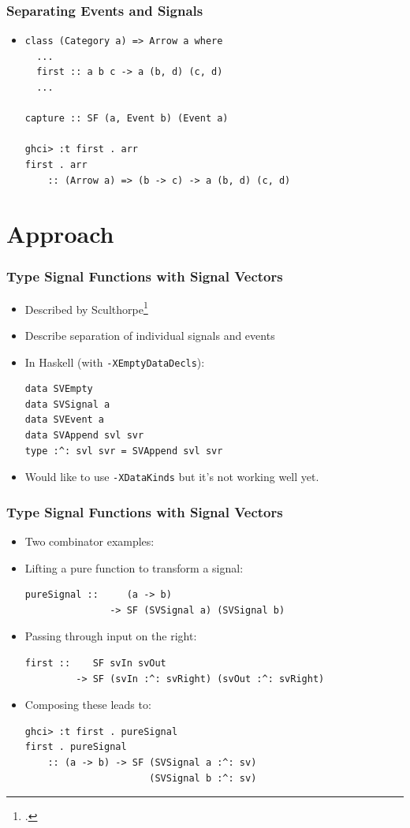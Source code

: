 \documentclass{beamer}
\begin{document}
\begin{frame}[fragile]
\frametitle{Separating Events and Signals}
    \begin{itemize}
        \item[]
\begin{Verbatim}
class (Category a) => Arrow a where
  ...
  first :: a b c -> a (b, d) (c, d)
  ...

capture :: SF (a, Event b) (Event a)

ghci> :t first . arr
first . arr
    :: (Arrow a) => (b -> c) -> a (b, d) (c, d)
\end{Verbatim}
    \end{itemize}
\end{frame}

\section{Approach}

\begin{frame}[fragile]
\frametitle{Type Signal Functions with Signal Vectors}

    \begin{itemize}
        \item Described by Sculthorpe\footcite{Sculthorpe2011}
        \item Describe separation of individual signals and events
        \item In Haskell (with {\tt -XEmptyDataDecls}):
\begin{Verbatim}
data SVEmpty
data SVSignal a
data SVEvent a
data SVAppend svl svr
type :^: svl svr = SVAppend svl svr
\end{Verbatim}
        \item Would like to use {\tt -XDataKinds} but it's not working well yet.
    \end{itemize}

\end{frame}

\begin{frame}[fragile]
\frametitle{Type Signal Functions with Signal Vectors}

    \begin{itemize}
        \item Two combinator examples:
        \item Lifting a pure function to transform a signal:
\begin{Verbatim}
pureSignal ::     (a -> b)
               -> SF (SVSignal a) (SVSignal b)
\end{Verbatim}
        \item Passing through input on the right:
\begin{Verbatim}
first ::    SF svIn svOut
         -> SF (svIn :^: svRight) (svOut :^: svRight)
\end{Verbatim}
        \item Composing these leads to:
\begin{Verbatim}
ghci> :t first . pureSignal
first . pureSignal
    :: (a -> b) -> SF (SVSignal a :^: sv)
                      (SVSignal b :^: sv)
\end{Verbatim}
    \end{itemize}
\end{frame}
\end{document}
